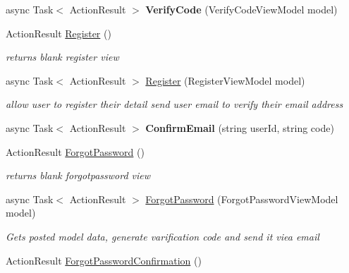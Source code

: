 \begin{DoxyCompactItemize}
\item 
\mbox{\label{class_alfa_accounting_1_1_controllers_1_1_account_controller_a758db6d952fd76b782ebb39320abe08b}} 
async Task$<$ Action\+Result $>$ {\bfseries Verify\+Code} (Verify\+Code\+View\+Model model)
\item 
Action\+Result \hyperlink{class_alfa_accounting_1_1_controllers_1_1_account_controller_a27ab611adeb70fd17fa7bac10fcc3532}{Register} ()
\begin{DoxyCompactList}\small\item\em returns blank register view \end{DoxyCompactList}\item 
async Task$<$ Action\+Result $>$ \hyperlink{class_alfa_accounting_1_1_controllers_1_1_account_controller_a0330ad4c73165a5e1a1051a732c77112}{Register} (Register\+View\+Model model)
\begin{DoxyCompactList}\small\item\em allow user to register their detail send user email to verify their email address \end{DoxyCompactList}\item 
\mbox{\label{class_alfa_accounting_1_1_controllers_1_1_account_controller_af9ec71efe908ba684ccee8bfd27f53d9}} 
async Task$<$ Action\+Result $>$ {\bfseries Confirm\+Email} (string user\+Id, string code)
\item 
Action\+Result \hyperlink{class_alfa_accounting_1_1_controllers_1_1_account_controller_a8b4dd78f4e62fb1858176f83e071f320}{Forgot\+Password} ()
\begin{DoxyCompactList}\small\item\em returns blank forgotpassword view \end{DoxyCompactList}\item 
async Task$<$ Action\+Result $>$ \hyperlink{class_alfa_accounting_1_1_controllers_1_1_account_controller_a197a77ef42b5d09fea5ff4d6381d7f36}{Forgot\+Password} (Forgot\+Password\+View\+Model model)
\begin{DoxyCompactList}\small\item\em Gets posted model data, generate varification code and send it viea email \end{DoxyCompactList}\item 
Action\+Result \hyperlink{class_alfa_accounting_1_1_controllers_1_1_account_controller_a42199ed23564186b3277f4c030cb4976}{Forgot\+Password\+Confirmation} ()

\end{DoxyCompactItemize}
